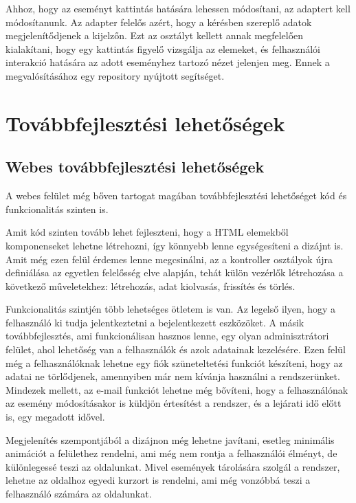 \documentclass[
]{thesis-ekf}
\theoremstyle{definition}
\theoremstyle{remark}
\begin{document}
	Ahhoz, hogy az eseményt kattintás hatására lehessen módosítani, az adaptert kell módosítanunk. Az adapter felelős azért, hogy a kérésben szereplő adatok megjelenítődjenek a kijelzőn. Ezt az osztályt kellett annak megfelelően kialakítani, hogy egy kattintás figyelő vizsgálja az elemeket, és felhasználói interakció hatására az adott eseményhez tartozó nézet jelenjen meg. Ennek a megvalósításához egy repository nyújtott segítséget.~\cite{recview_onclick} 
	
	\chapter{Továbbfejlesztési lehetőségek}
	\section{Webes továbbfejlesztési lehetőségek}
	A webes felület még bőven tartogat magában továbbfejlesztési lehetőséget kód és funkcionalitás szinten is. 
	
	Amit kód szinten tovább lehet fejleszteni, hogy a HTML elemekből komponenseket lehetne létrehozni, így könnyebb lenne egységesíteni a dizájnt is. Amit még ezen felül érdemes lenne megcsinálni, az a kontroller osztályok újra definiálása az egyetlen felelősség elve alapján, tehát külön vezérlők létrehozása a következő műveletekhez: létrehozás, adat kiolvasás, frissítés és törlés. 
	
	Funkcionalitás szintjén több lehetséges ötletem is van. Az legelső ilyen, hogy a felhasználó ki tudja jelentkeztetni a bejelentkezett eszközöket. A másik továbbfejlesztés, ami funkcionálisan hasznos lenne, egy olyan adminisztrátori felület, ahol lehetőség van a felhasználók és azok adatainak kezelésére. Ezen felül még a felhasználóknak lehetne egy fiók szüneteltetési funkciót készíteni, hogy az adatai ne törlődjenek, amennyiben már nem kívánja használni a rendszerünket. Mindezek mellett, az e-mail funkciót lehetne még bővíteni, hogy a felhasználónak az esemény módosításakor is küldjön értesítést a rendszer, és a lejárati idő előtt is, egy megadott idővel.
	
	Megjelenítés szempontjából a dizájnon még lehetne javítani, esetleg minimális animációt a felülethez rendelni, ami még nem rontja a felhasználói élményt, de különlegessé teszi az oldalunkat. Mivel események tárolására szolgál a rendszer, lehetne az oldalhoz egyedi kurzort is rendelni, ami még vonzóbbá teszi a felhasználó számára az oldalunkat. 
	
	
\end{document}
